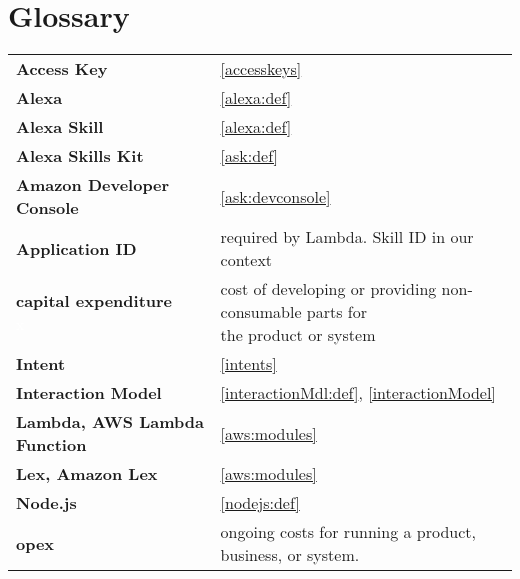 \newpage
\section*{Glossary}
%

\begin{flushleft}
\begin{tabular}{ll}

\textbf{Access Key}			&	 	\ref{accesskeys}\\


\textbf{Alexa}				&		\ref{alexa:def}\\
\textbf{Alexa Skill}		&		\ref{alexa:def}\\
\textbf{Alexa Skills Kit}	&		\ref{ask:def}\\
\textbf{Amazon Developer Console}&	\ref{ask:devconsole}\\

\textbf{Application ID}		&	required by Lambda. Skill ID in our context\\

\shortstack[l]{\textbf{capital expenditure}\\ \textcolor{white}{x}}	&	\shortstack[l]{cost of developing or providing non-consumable parts for \\ the product or system}\\


\textbf{Intent}				&		\ref{intents}\\
\textbf{Interaction Model}	&		\ref{interactionMdl:def}, \ref{interactionModel}\\



\textbf{Lambda, AWS Lambda Function}	&		\ref{aws:modules}\\
\textbf{Lex, Amazon Lex}	&		\ref{aws:modules}\\

\textbf{Node.js}			&		\ref{nodejs:def}\\

\textbf{opex}				&  ongoing costs for running a product, business, or system. \\



\end{tabular}
\end{flushleft}
